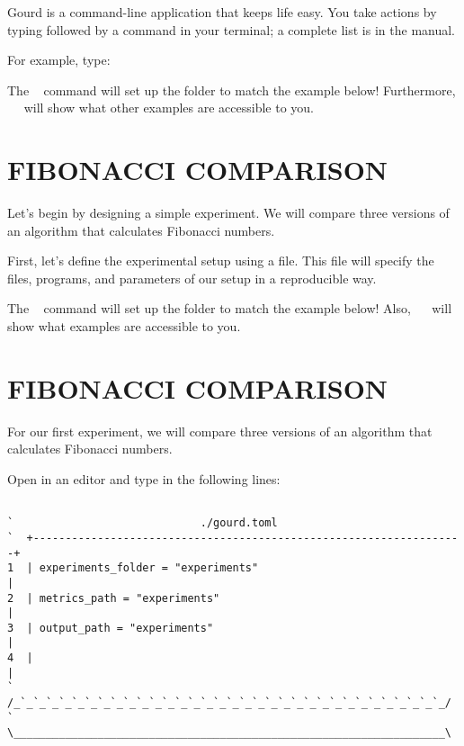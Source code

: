 \documentclass[a4paper,english]{article}
\begin{document}
\begin{adjustwidth}{18pt}{0pt}
    Gourd is a command-line application that keeps life easy.
    You take actions by typing  followed by a command in your
    terminal; a complete list is in the manual.

    For example, type:
    ~
    ~~

    The ~ command will set up the  folder
    to match the example below!
    Furthermore, ~~ will show what
    other examples are accessible to you.

    \section{FIBONACCI COMPARISON}

    Let's begin by designing a simple experiment.
    We will compare three versions of an algorithm that calculates Fibonacci
    numbers.

    First, let's define the experimental setup using a 
    file. This file will specify the files, programs, and parameters of our
    setup in a reproducible way.


    The ~ command will set up the  folder to match
    the example below!
    Also, ~~ will show what examples are accessible to you.


    \section{FIBONACCI COMPARISON}

    For our first experiment, we will compare three versions of an algorithm
    that calculates Fibonacci numbers.

    Open  in an editor and type in the following lines:

    \begin{verbatim}

`                             ./gourd.toml
`  +-------------------------------------------------------------------+
1  | experiments_folder = "experiments"                                |
2  | metrics_path = "experiments"                                      |
3  | output_path = "experiments"                                       |
4  |                                                                   |
`  /_`_`_`_`_`_`_`_`_`_`_`_`_`_`_`_`_`_`_`_`_`_`_`_`_`_`_`_`_`_`_`_`_`_/
`  \___________________________________________________________________\
    \end{verbatim}


\end{adjustwidth}
\end{document}
